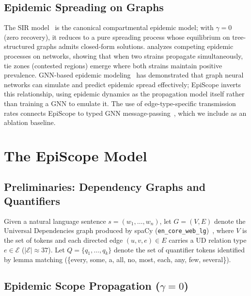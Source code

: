 \documentclass[11pt,letterpaper]{article}
\begin{document}
\subsection{Epidemic Spreading on Graphs}

The SIR model~\citep{Kermack1927} is the canonical compartmental epidemic model; with $\gamma = 0$ (zero
recovery), it reduces to a pure spreading process whose equilibrium on tree-structured graphs admits closed-form
solutions. \citet{Newman2005} analyzes competing epidemic processes on networks, showing that when two strains
propagate simultaneously, tie zones (contested regions) emerge where both strains maintain positive prevalence.
GNN-based epidemic modeling~\citep{Liu2024} has demonstrated that graph neural networks can simulate and predict
epidemic spread effectively; EpiScope inverts this relationship, using epidemic dynamics as the propagation model
itself rather than training a GNN to emulate it. The use of edge-type-specific transmission rates connects
EpiScope to typed GNN message-passing~\citep{Ji2019}, which we include as an ablation baseline.

\section{The EpiScope Model}
\label{sec:model}

\subsection{Preliminaries: Dependency Graphs and Quantifiers}

Given a natural language sentence $s = (w_1, \ldots, w_n)$, let $G = (V, E)$ denote the Universal Dependencies
graph produced by spaCy (\texttt{en\_core\_web\_lg})~\citep{Honnibal2020}, where $V$ is the set of tokens and
each directed edge $(u, v, e) \in E$ carries a UD relation type $e \in \mathcal{E}$ ($|\mathcal{E}| \approx
37$). Let $Q = \{q_1, \ldots, q_k\}$ denote the set of quantifier tokens identified by lemma matching
(\{every, some, a, all, no, most, each, any, few, several\}).

\subsection{Epidemic Scope Propagation (\texorpdfstring{$\gamma = 0$}{gamma=0})}
\end{document}

